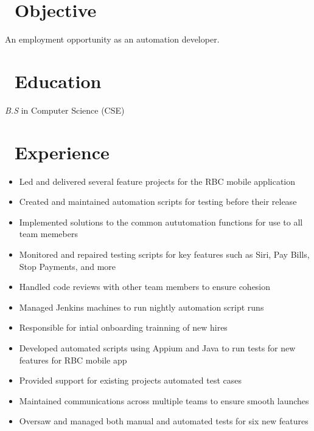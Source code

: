 \documentclass{resume}
\begin{document}



\section{\faSearch\ Objective}
An employment opportunity as an automation developer.

\section{\faGraduationCap\ Education}
\textit{B.S} in Computer Science (CSE)

\section{\faUsers\ Experience}
\role{QA Analyst}

\begin{itemize}
  \item Led and delivered several feature projects for the RBC mobile application
  \item Created and maintained automation scripts for testing before their release
  \item Implemented solutions to the common aututomation functions for use to all team memebers
  \item Monitored and repaired testing scripts for key features such as Siri, Pay Bills, Stop Payments, and more
  \item Handled code reviews with other team members to ensure cohesion
  \item Managed Jenkins machines to run nightly automation script runs
  \item Responsible for intial onboarding trainning of new hires
\end{itemize}


\begin{itemize}
  \item Developed automated scripts using Appium and Java to run tests for new features for RBC mobile app
  \item Provided support for existing projects automated test cases 
  \item Maintained communications across multiple teams to ensure smooth launches
  \item Oversaw and managed both manual and automated tests for six new features
\end{itemize}
\end{document}
